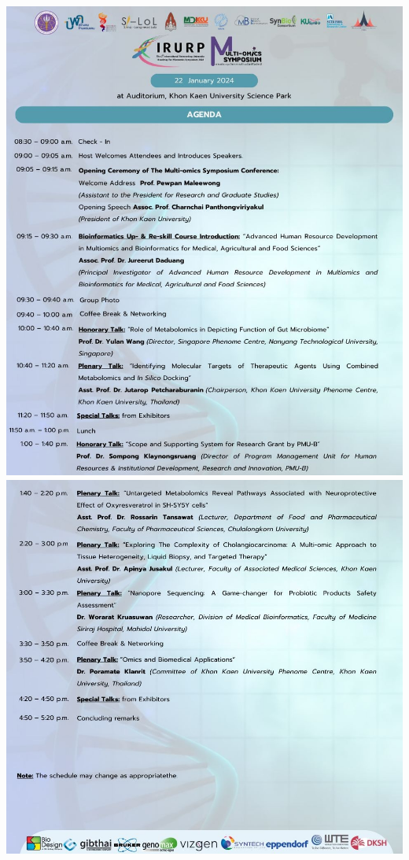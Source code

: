 \documentclass[
]{article}
\begin{document}
\hypertarget{section-1}{%
\subsection{\texorpdfstring{\protect\includegraphics{Page/elements/img/Agenda/Agenda_1.jpg}\protect\includegraphics{Page/elements/img/Agenda/Agenda_2.jpg}}{}}\label{section-1}}
\end{document}
